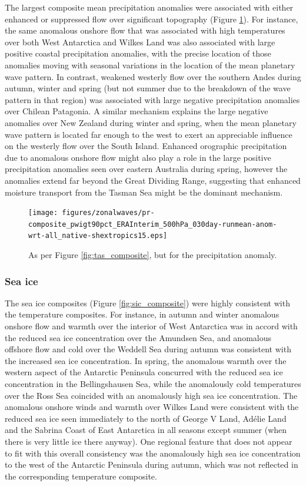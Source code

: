 The largest composite mean precipitation anomalies were associated with either enhanced or suppressed flow over significant topography (Figure \ref{fig:pr_composite}). For instance, the same anomalous onshore flow that was associated with high temperatures over both West Antarctica and Wilkes Land was also associated with large positive coastal precipitation anomalies, with the precise location of those anomalies moving with seasonal variations in the location of the mean planetary wave pattern. In contrast, weakened westerly flow over the southern Andes during autumn, winter and spring (but not summer due to the breakdown of the wave pattern in that region) was associated with large negative precipitation anomalies over Chilean Patagonia. A similar mechanism explains the large negative anomalies over New Zealand during winter and spring, when the mean planetary wave pattern is located far enough to the west to exert an appreciable influence on the westerly flow over the South Island. Enhanced orographic precipitation due to anomalous onshore flow might also play a role in the large positive precipitation anomalies seen over eastern Australia during spring, however the anomalies extend far beyond the Great Dividing Range, suggesting that enhanced moisture transport from the Tasman Sea might be the dominant mechanism. 

\begin{figure}
\begin{center}
\texttt{[image: figures/zonalwaves/pr-composite\_pwigt90pct\_ERAInterim\_500hPa\_030day-runmean-anom-wrt-all\_native-shextropics15.eps]}
\caption{\label{fig:pr_composite}
As per Figure \ref{fig:tas_composite}, but for the precipitation anomaly.}
\end{center}
\end{figure}

    
\subsubsection{Sea ice}

The sea ice composites (Figure \ref{fig:sic_composite}) were highly consistent with the temperature composites. For instance, in autumn and winter anomalous onshore flow and warmth over the interior of West Antarctica was in accord with the reduced sea ice concentration over the Amundsen Sea, and anomalous offshore flow and cold over the Weddell Sea during autumn was consistent with the increased sea ice concentration. In spring, the anomalous warmth over the western aspect of the Antarctic Peninsula concurred with the reduced sea ice concentration in the Bellingshausen Sea, while the anomalously cold temperatures over the Ross Sea coincided with an anomalously high sea ice concentration. The anomalous onshore winds and warmth over Wilkes Land were consistent with the reduced sea ice seen immediately to the north of George V Land, Ad{\'e}lie Land and the Sabrina Coast of East Antarctica in all seasons except summer (when there is very little ice there anyway). One regional feature that does not appear to fit with this overall consistency was the anomalously high sea ice concentration to the west of the Antarctic Peninsula during autumn, which was not reflected in the corresponding temperature composite.
 
